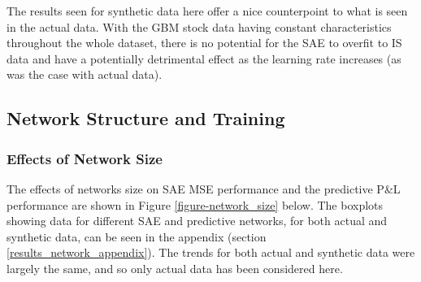 \documentclass[a4paper,11pt,oneside]{article}
\theoremstyle{plain}
\theoremstyle{definition}
\begin{document}
	The results seen for synthetic data here offer a nice counterpoint to what is seen in the actual data. With the GBM stock data having constant characteristics throughout the whole dataset, there is no potential for the SAE to overfit to IS data and have a potentially detrimental effect as the learning rate increases (as was the case with actual data).
	
	

	
	\newpage
	
	\subsection{Network Structure and Training}\label{results_network}
	
	\subsubsection{Effects of Network Size}
	
	The effects of networks size on SAE MSE performance and the predictive P\&L performance are shown in Figure \ref{figure-network_size} below. The boxplots showing data for different SAE and predictive networks, for both actual and synthetic data, can be seen in the appendix (section \ref{results_network_appendix}). The trends for both actual and synthetic data were largely the same, and so only actual data has been considered here.
	
\end{document}
